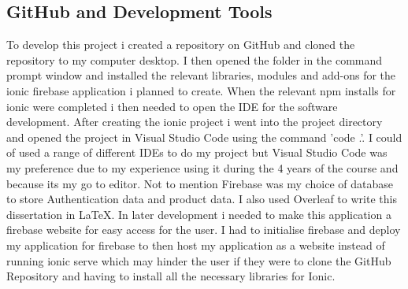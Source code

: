 \subsection{GitHub and Development Tools}
To develop this project i created a repository on GitHub and cloned the repository to my computer desktop. I then opened the folder in the command prompt window and installed the relevant libraries, modules and add-ons for the ionic firebase application i planned to create. When the relevant npm installs for ionic were completed i then needed to open the IDE for the software development. After creating the ionic project i went into the project directory and opened the project in Visual Studio Code using the command 'code .'. I could of used a range of different IDEs to do my project but Visual Studio Code was my preference due to my experience using it during the 4 years of the course and because its my go to editor. Not to mention Firebase was my choice of database to store Authentication data and product data. I also used Overleaf to write this dissertation in LaTeX. In later development i needed to make this application a firebase website for easy access for the user. I had to initialise firebase and deploy my application for firebase to then host my application as a website instead of running ionic serve which may hinder the user if they were to clone the GitHub Repository and having to install all the necessary libraries for Ionic.